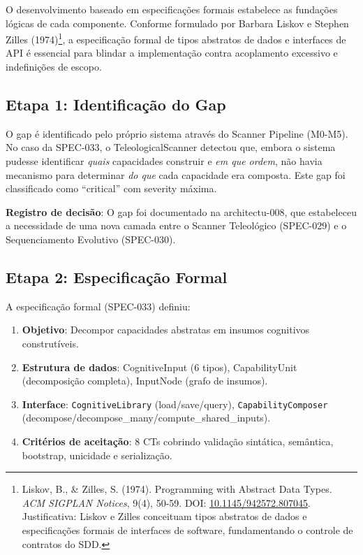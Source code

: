 \documentclass[12pt,a4paper,oneside]{abntex2}
\begin{document}
\begin{apendicesenv}
O desenvolvimento baseado em especificações formais estabelece as fundações lógicas de cada componente. Conforme formulado por Barbara Liskov e Stephen Zilles (1974)\footnote{Liskov, B., \& Zilles, S. (1974). Programming with Abstract Data Types. \textit{ACM SIGPLAN Notices}, 9(4), 50-59. DOI: \href{https://doi.org/10.1145/942572.807045}{10.1145/942572.807045}. Justificativa: Liskov e Zilles conceituam tipos abstratos de dados e especificações formais de interfaces de software, fundamentando o controle de contratos do SDD.}, a especificação formal de tipos abstratos de dados e interfaces de API é essencial para blindar a implementação contra acoplamento excessivo e indefinições de escopo.

\subsection{Etapa 1: Identificação do Gap}

O gap é identificado pelo próprio sistema através do Scanner Pipeline (M0-M5). No caso da SPEC-033, o TeleologicalScanner detectou que, embora o sistema pudesse identificar \textit{quais} capacidades construir e \textit{em que ordem}, não havia mecanismo para determinar \textit{do que} cada capacidade era composta. Este gap foi classificado como ``critical'' com severity máxima.

\textbf{Registro de decisão}: O gap foi documentado na architectu-008, que estabeleceu a necessidade de uma nova camada entre o Scanner Teleológico (SPEC-029) e o Sequenciamento Evolutivo (SPEC-030).

\subsection{Etapa 2: Especificação Formal}

A especificação formal (SPEC-033) definiu:

\begin{enumerate}
    \item \textbf{Objetivo}: Decompor capacidades abstratas em insumos cognitivos construtíveis.
    \item \textbf{Estrutura de dados}: CognitiveInput (6 tipos), CapabilityUnit (decomposição completa), InputNode (grafo de insumos).
    \item \textbf{Interface}: \texttt{CognitiveLibrary} (load/save/query), \texttt{CapabilityComposer} (de\-com\-pose/de\-com\-pose\_many/com\-pute\_shared\_in\-puts).
    \item \textbf{Critérios de aceitação}: 8 CTs cobrindo validação sintática, semântica, bootstrap, unicidade e serialização.
\end{enumerate}


\end{apendicesenv}
\end{document}
